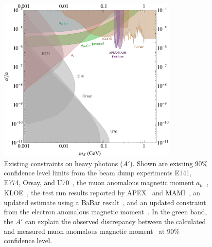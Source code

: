 \begin{figure}[ht]
\centering
\includegraphics[width=0.8\textwidth]{limit_g-2_electron.pdf} 
\caption{ Existing constraints on heavy photons ($A'$). 
Shown are existing 90\% confidence level limits from the beam dump experiments 
E141, E774, Orsay, and U70~\cite{Bjorken:2009mm,Blumlein:2011mv,Andreas:2012mt,Riordan:1987aw,Bross:1989mp,Davier:1989wz,Konaka:1986cb}, 
the muon anomalous magnetic moment $a_\mu$~\cite{Pospelov:2008zw},  
KLOE~\cite{Collaboration:2011zc}, 
the test run results reported by APEX~\cite{Abrahamyan:2011gv} and MAMI~\cite{Merkel:2011ze}, 
an updated estimate using a BaBar result~\cite{Bjorken:2009mm,Reece:2009un,Aubert:2009cp}, 
and an updated constraint from the electron anomalous magnetic moment~\cite{endo:g2e,Davoudiasl:2012ig}. 
In the green band, the $A'$ can explain the observed discrepancy between the
calculated and measured muon anomalous magnetic moment~\cite{Pospelov:2008zw} 
at 90\% confidence level.
}
\label{fig:hspaw-heavy-A'}
\end{figure}

